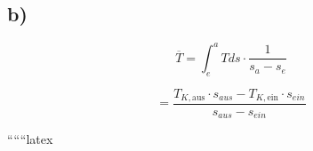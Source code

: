 

\subsection*{b)}

\[
\overline{T} = \int_{e}^{a} T ds \cdot \frac{1}{s_a - s_e}
\]

\[
= \frac{T_{K, \text{aus}} \cdot s_{aus} - T_{K, \text{ein}} \cdot s_{ein}}{s_{aus} - s_{ein}}
\]

``````latex